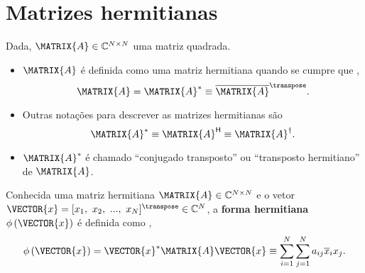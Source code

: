 \section{ Matrizes hermitianas}


\begin{definition}\label{def:hermitianamatrix0}
Dada, $\MATRIX{A} \in \mathbb{C}^{N \times N}$ uma matriz quadrada. 
\begin{itemize}
\item $\MATRIX{A}$ é definida como uma matriz hermitiana quando se cumpre que 
\cite[pp. 12]{pillai2008space} \cite[pp. 411]{korn2013mathematical}, 
\begin{equation}
\MATRIX{A} = \MATRIX{A}^{\ast} \equiv \overline{\MATRIX{A}}^{\transpose}.
\end{equation}
\item Outras notações para descrever as matrizes hermitianas são 
\begin{equation}
\MATRIX{A}^{\ast} \equiv \MATRIX{A}^{\mathsf{H}}\equiv \MATRIX{A}^{\dagger}. 
\end{equation}
\end{itemize}
\end{definition}

\begin{tcbattention}
\begin{itemize}
\item $\MATRIX{A}^{\ast}$ é chamado ``conjugado transposto'' ou ``transposto hermitiano'' de $\MATRIX{A}$.
\end{itemize}
\end{tcbattention}

\begin{definition}\label{def:formhermitiana0}
Conhecida uma matriz hermitiana $\MATRIX{A}\in \mathbb{C}^{N \times N}$ e 
o vetor $\VECTOR{x}=[x_1,~x_2,~...,~x_N]^{\transpose}\in \mathbb{C}^{N}$,
a \textbf{forma hermitiana} $\phi\left(\VECTOR{x}\right)$ é definida como
\cite[pp. 386]{mirsky2012introduction} \cite[pp. 339]{datta2016matrix}, 
\begin{equation}
\phi\left(\VECTOR{x}\right) = 
\VECTOR{x}^{\ast}\MATRIX{A}\VECTOR{x} \equiv 
\sum_{i=1}^{N} \sum_{j=1}^{N} a_{ij}\overline{x}_i x_j.
\end{equation}
\end{definition}


